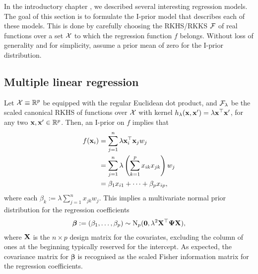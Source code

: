 In the introductory chapter , we described several interesting regression models.
The goal of this section is to formulate the I-prior model that describes each of these models.
This is done by carefully choosing the RKHS/RKKS ${\mathcal F}$ of real functions over a set ${\mathcal X}$ to which the regression function $f$ belongs.
Without loss of generality and for simplicity, assume a prior mean of zero for the I-prior distribution.

\subsection{Multiple linear regression}

Let ${\mathcal X}\equiv \mathbb{R}^p$ be equipped with the regular Euclidean dot product, and ${\mathcal F}_\lambda$ be the scaled canonical RKHS of functions over ${\mathcal X}$ with kernel $h_\lambda({\mathbf x},{\mathbf x}') = \lambda {\mathbf x}^\top{\mathbf x}'$, for any two ${\mathbf x},{\mathbf x}'\in\mathbb{R}^p$. 
Then, an I-prior on $f$ implies that 
\begin{align*}
  f({\mathbf x}_i) &= \sum_{j=1}^n \lambda {\mathbf x}_i^\top{\mathbf x}_j w_j \\
  &= \sum_{j=1}^n \lambda \left( \sum_{k=1}^p x_{ik}x_{jk} \right) w_j \\
  &= \beta_1 x_{i1} + \dots + \beta_p x_{ip},
\end{align*}
where each $\beta_k := \lambda \sum_{j=1}^n  x_{jk}w_j$.
This implies a multivariate normal prior distribution for the regression coefficients   
\begin{align}\label{eq:ipriorcanonical}
  \boldsymbol\beta := (\beta_1,\dots,\beta_p) \sim \operatorname{N}_p({\mathbf 0}, \lambda^2 {\mathbf X}^\top {\bm\Psi} {\mathbf X}),
\end{align}
where ${\mathbf X}$ is the $n \times p$ design matrix for the covariates, excluding the column of ones at the beginning typically reserved for the intercept. 
As expected, the covariance matrix for $\boldsymbol\beta$ is recognised as the scaled Fisher information matrix for the regression coefficients.

